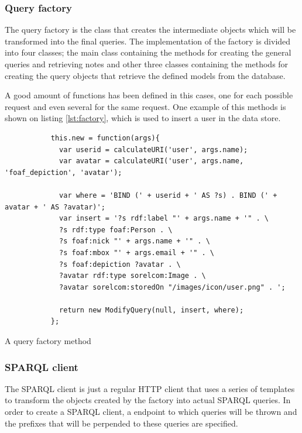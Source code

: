 \subsubsection*{Query factory}

The query factory is the class that creates the intermediate objects which will be transformed into the final queries. The implementation of the factory is divided into four classes; the main class containing the methods for creating the general queries and retrieving notes and other three classes containing the methods for creating the query objects that retrieve the defined models from the database.

A good amount of functions has been defined in this cases, one for each possible request and even several for the same request. One example of this methods is shown on listing \ref{lst:factory}, which is used to insert a user in the data store.

\begin{listing}[ht]\centering
  \begin{minipage}{.8\textwidth}
    \begin{verbatim}
	       this.new = function(args){ 
	         var userid = calculateURI('user', args.name);
	         var avatar = calculateURI('user', args.name, 'foaf_depiction', 'avatar');
	     
	         var where = 'BIND (' + userid + ' AS ?s) . BIND (' + avatar + ' AS ?avatar)';
	         var insert = '?s rdf:label "' + args.name + '" . \
	         ?s rdf:type foaf:Person . \
	         ?s foaf:nick "' + args.name + '" . \
	         ?s foaf:mbox "' + args.email + '" . \
	         ?s foaf:depiction ?avatar . \
	         ?avatar rdf:type sorelcom:Image . \
	         ?avatar sorelcom:storedOn "/images/icon/user.png" . ';
	     
	         return new ModifyQuery(null, insert, where);
	       };
    \end{verbatim}
  \end{minipage}
  \caption{A query factory method}\label{lst:factory}
\end{listing}

\subsubsection*{SPARQL client}

The SPARQL client is just a regular HTTP client that uses a series of templates to transform the objects created by the factory into actual SPARQL queries. In order to create a SPARQL client, a endpoint to which queries will be thrown and the prefixes that will be perpended to these queries are specified.

